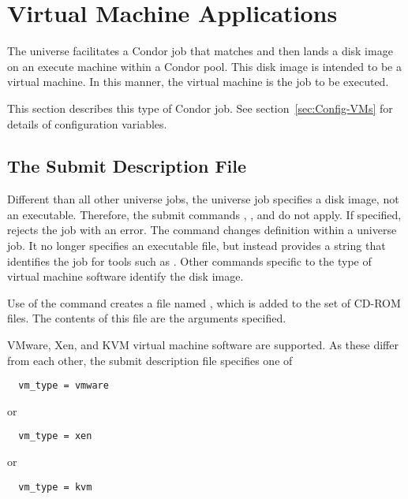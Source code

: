 \section{\label{sec:vmuniverse}Virtual Machine Applications}

The  universe facilitates a Condor job
that matches and then lands a disk image on an execute machine
within a Condor pool.
This disk image is intended to be a virtual machine.
In this manner, the virtual machine is the job to be executed.

This section describes this type of Condor job.
See section~\ref{sec:Config-VMs}
for details of configuration variables.

\subsection{\label{sec:vm-submitfile}The Submit Description File}

Different than all other universe jobs,
the  universe job specifies a disk image,
not an executable.
Therefore, the submit commands , ,
and  do not apply.
If specified,  rejects the job with an error.
The  command changes definition within a
 universe job.
It no longer specifies an executable file, but instead
provides a string that identifies the job for tools such
as .
Other commands specific to the type of virtual machine software
identify the disk image.

Use of the  command creates a file named ,
which is added to the set of CD-ROM files.
The contents of this file are the arguments specified.

VMware, Xen, and KVM virtual machine software are supported.
As these differ from each other, the submit description file
specifies one of
\begin{verbatim}
  vm_type = vmware
\end{verbatim}
or
\begin{verbatim}
  vm_type = xen
\end{verbatim}
or
\begin{verbatim}
  vm_type = kvm
\end{verbatim}

